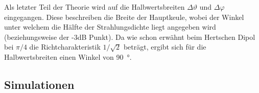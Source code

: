 Als letzter Teil der Theorie wird auf die Halbwertsbreiten $\Delta \vartheta$ und $\Delta \varphi$ eingegangen. Diese beschreiben die Breite der Hauptkeule, wobei der Winkel unter welchem die Hälfte der Strahlungsdichte liegt angegeben wird (beziehungsweise der -3dB Punkt). Da wie schon erwähnt beim Hertschen Dipol bei $\pi/4$ die Richtcharakteristik $1/\sqrt{2}$ beträgt, ergibt sich für die Halbwertsbreiten einen Winkel von \SI{90}{\degree}.

\subsection{Simulationen}

